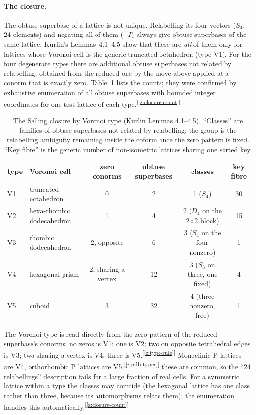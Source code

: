 \documentclass[11pt]{article}
\newcommand{\chk}[1]{\textsuperscript{[\ref{#1}]}}
\begin{document}
\paragraph{The closure.}
The obtuse superbase of a lattice is not unique. Relabelling its four vectors ($S_4$, 24 elements) and negating all of them ($\pm I$) always give obtuse superbases of the same lattice. Kurlin's Lemmas~4.1--4.5 show that these are \emph{all} of them only for lattices whose Voronoi cell is the generic truncated octahedron (type V1). For the four degenerate types there are additional obtuse superbases not related by relabelling, obtained from the reduced one by the move above applied at a conorm that is exactly zero. Table~\ref{tab:closure} lists the counts; they were confirmed by exhaustive enumeration of all obtuse superbases with bounded integer coordinates for one test lattice of each type.\chk{z:closure-count}

\begin{table}[h]
\centering
\caption{The Selling closure by Voronoi type (Kurlin Lemmas 4.1--4.5). ``Classes'' are families of obtuse superbases not related by relabelling; the group is the relabelling ambiguity remaining inside the coform once the zero pattern is fixed. ``Key fibre'' is the generic number of non-isometric lattices sharing one sorted key.}
\label{tab:closure}
\begin{tabular}{llcccc}
\toprule
type & Voronoi cell & zero conorms & obtuse superbases & classes & key fibre \\
\midrule
V1 & truncated octahedron & 0 & 2 & 1 ($S_4$) & 30 \\
V2 & hexa-rhombic dodecahedron & 1 & 4 & 2 ($D_4$ on the 2$\times$2 block) & 15 \\
V3 & rhombic dodecahedron & 2, opposite & 6 & 3 ($S_4$ on the four nonzero) & 1 \\
V4 & hexagonal prism & 2, sharing a vertex & 12 & 3 ($S_3$ on three, one fixed) & 4 \\
V5 & cuboid & 3 & 32 & 4 (three nonzero, free) & 1 \\
\bottomrule
\end{tabular}
\end{table}

The Voronoi type is read directly from the zero pattern of the reduced superbase's conorms: no zeros is V1; one is V2; two on opposite tetrahedral edges is V3; two sharing a vertex is V4; three is V5.\chk{z:type-rule} Monoclinic P lattices are V4, orthorhombic P lattices are V5;\chk{z:pdb-types} these are common, so the ``24 relabellings'' description fails for a large fraction of real cells. For a symmetric lattice within a type the classes may coincide (the hexagonal lattice has one class rather than three, because its automorphisms relate them); the enumeration handles this automatically.\chk{z:closure-count}
\end{document}

